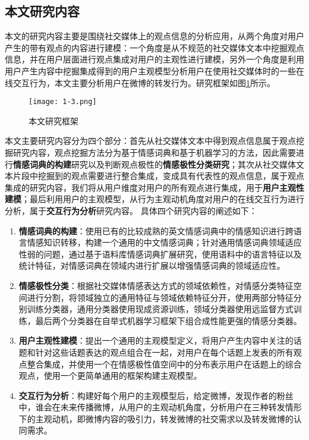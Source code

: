 \subsection{本文研究内容}
本文的研究内容主要是围绕社交媒体上的观点信息的分析应用，从两个角度对用户产生的带有观点的内容进行建模：一个角度是从不规范的社交媒体文本中挖掘观点信息，并在用户层面进行观点集成对用户的主观性进行建模，另外一个角度是利用用户产生内容中挖掘集成得到的用户主观模型分析用户在使用社交媒体时的一些在线交互行为，本文主要分析用户在微博的转发行为。研究框架如图\ref{fig1-3}所示。

\begin{figure}[htp]
\centering
\texttt{[image: 1-3.png]}
\caption{本文研究框架}
\label{fig1-3}
\end{figure}

本文主要研究内容分为四个部分：首先从社交媒体文本中得到观点信息属于观点挖掘研究内容，观点挖掘方法分为基于情感词典和基于机器学习的方法，因此需要进行\textbf{情感词典的构建}研究以及判断观点极性的\textbf{情感极性分类研究}；其次从社交媒体文本片段中挖掘到的观点需要进行整合集成，变成具有代表性的观点信息，属于观点集成的研究内容，我们将从用户维度对用户的所有观点进行集成，用于\textbf{用户主观性建模}；最后利用用户的主观模型，从行为主观动机角度对用户的在线交互行为进行分析，属于\textbf{交互行为分析}研究内容。
具体四个研究内容的阐述如下：

\begin{enumerate}
\item \textbf{情感词典的构建}：使用已有的比较成熟的英文情感词典中的情感知识进行跨语言情感知识转移，构建一个通用的中文情感词典；针对通用情感词典领域适应性弱的问题，通过基于语料库情感词典扩展研究，使用语料中的语言特征以及统计特征，对情感词典在领域内进行扩展以增强情感词典的领域适应性。
\item \textbf{情感极性分类}：根据社交媒体情感表达方式的领域依赖性，对情感分类特征空间进行分割，将领域独立的通用特征与领域依赖特征分开，使用两部分特征分别训练分类器，通用分类器使用现成资源训练，领域分类器使用远监督方式训练，最后两个分类器在自举式机器学习框架下组合成性能更强的情感分类器。
\item \textbf{用户主观性建模}：提出一个通用的主观模型定义，将用户产生内容中关注的话题和针对这些话题表达的观点组合在一起，对用户在每个话题上发表的所有观点整合集成，并使用一个在情感极性值空间中的分布表示用户在话题上的综合观点，使用一个更简单通用的框架构建主观模型。
\item \textbf{交互行为分析}：构建好每个用户的主观模型后，给定微博，发现作者的粉丝中，谁会在未来传播微博，从用户的主观动机角度，分析用户在三种转发情形下的主观动机，即微博内容的吸引力，转发微博的社交需求以及转发微博的认同需求。
\end{enumerate}


